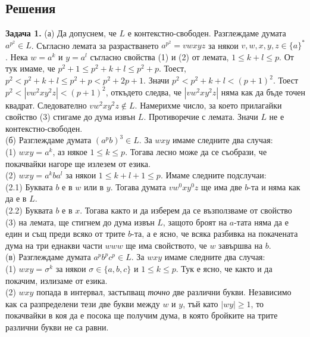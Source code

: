 \documentclass[openany]{book}
\begin{document}
\subsection{Решения}
    \textbf{Задача 1.} (а) Да допуснем, че $L$ е контекстно-свободен. 
    Разглеждаме думата $a^{p^2} \in L$. Съгласно лемата за 
    разрастването $a^{p^2} = vwxyz$ за някои $v,w,x,y,z \in \{a\}^*$. Нека
    $w = a^k$ и $y = a^l$ съгласно свойства (1) и (2) от лемата, $1 \leq k + l \leq p$.
    От тук имаме, че $p^2 + 1 \leq p^2 + k + l \leq p^2 + p$. Тоест, 
    $p^2 < p^2 + k + l \leq p^2 + p < p^2 + 2p + 1$. Значи 
    $p^2 < p^2 + k + l < (p+1)^2$. Тоест $p^2 < |vw^2xy^2z| < (p+1)^2$, откъдето
    следва, че $|vw^2xy^2z|$ няма как да бъде точен квадрат. Следователно
    $vw^2xy^2z \notin L$. Намерихме число, за което прилагайки свойство (3) стигаме
    до дума извън $L$. Противоречие с лемата. Значи $L$ не е контекстно-свободен. \\
    \vspace{5pt}
    (б) Разглеждаме думата $(a^pb)^3 \in L$. За $wxy$ имаме следните два случая: \\
    (1) $wxy = a^k$, аз някое $1 \leq k \leq p$. Тогава лесно може да се 
    съобрази, че покачвайки нагоре ще излезем от езика. \\
    (2) $wxy = a^kba^l$ за някои $1 \leq k + l + 1 \leq p$. Имаме следните 
    подслучаи: \\
    \hspace{15pt}(2.1) Буквата $b$ е в $w$ или в $y$. Тогава думата $vw^0xy^0z$ ще има
    две $b$-та и няма как да е в $L$. \\
    \hspace{15pt}(2.2) Буквата $b$ е в $x$. Тогава както и да изберем да се възползваме
    от свойство (3) на лемата, ще стигнем до дума извън $L$, защото броят на $a$-тата
    няма да е един и същ преди всяко от трите $b$-та, а е ясно, че всяка разбивка на
    покачената дума на три еднакви части $www$ ще има свойството, че $w$ завършва на 
    $b$.\\
    \vspace{5pt}
    (в) Разглеждаме думата $a^pb^pc^p \in L$. За $wxy$ имаме следните два случая: \\
    (1) $wxy = \sigma^k$ за някои $\sigma \in \{a,b,c\}$ и $1 \leq k \leq p$. Тук е 
    ясно, че както и да покачим, излизаме от езика. \\
    (2) $wxy$ попада в интервал, застъпващ \textit{точно} две различни букви. 
    Независимо как са разпределени тези две букви между $w$ и $y$, тъй като
    $|wy| \geq 1$, то покачвайки в коя да е посока ще получим дума, в която бройките
    на трите различни букви не са равни.
\end{document}
